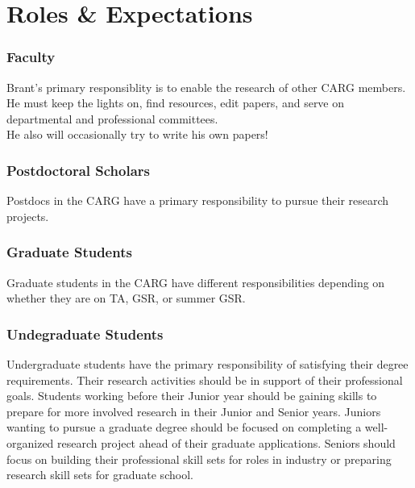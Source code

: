 \section{Roles \& Expectations}
\label{sec:roles}

\subsubsection{Faculty}

Brant's primary responsiblity
is to enable the research
of other CARG members. He
must keep the lights on,
find resources, edit
papers, and serve on departmental
and professional committees.\\

\noindent
He also will occasionally try to
write his own papers!


\subsubsection{Postdoctoral Scholars}

Postdocs in the CARG have
a primary responsibility
to pursue their research 
projects.

\subsubsection{Graduate Students}

Graduate students in the CARG have
different responsibilities
depending on whether they
are on TA, GSR, or summer GSR.

\subsubsection{Undegraduate Students}

Undergraduate students have the primary responsibility
of satisfying their degree requirements. Their research
activities should be in support of their professional goals.
Students working before their Junior year should be gaining
skills to prepare for more involved research in their
Junior and Senior years. Juniors wanting to pursue a 
graduate degree should be focused on 
completing a well-organized research project ahead of their
graduate applications. Seniors should focus on building their
professional skill sets for roles in industry or preparing
research skill sets for graduate school.

